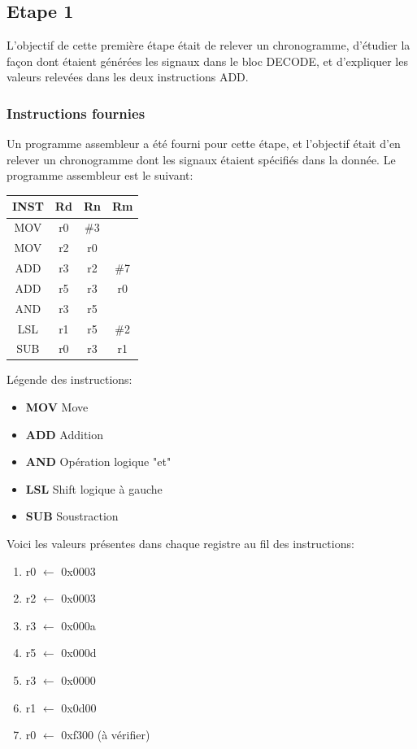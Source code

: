 \documentclass[a4paper]{article} %
\begin{document}
\subsection{Etape 1}
L'objectif de cette première étape était de relever un chronogramme, d'étudier la façon dont étaient générées les signaux dans le bloc DECODE, et d'expliquer les valeurs relevées dans les deux instructions ADD.
\subsubsection{Instructions fournies}
Un programme assembleur a été fourni pour cette étape, et l'objectif était d'en relever un chronogramme dont les signaux étaient spécifiés dans la donnée.
Le programme assembleur est le suivant:\medskip \\ 
\begin{center}
\begin{tabular}{|c|c|c|c|}
    \hline
    INST  & Rd & Rn   & Rm  \\
    \hline
    MOV  & r0 & \#3  &     \\
    \hline
    MOV  & r2 & r0   &     \\
    \hline
    ADD  & r3 & r2   & \#7 \\
    \hline
    ADD  & r5 & r3   & r0  \\
    \hline
    AND  & r3 & r5   &     \\
    \hline
    LSL  & r1 & r5   & \#2 \\
    \hline
    SUB  & r0 & r3   & r1  \\
    \hline
\end{tabular}
\end{center}

Légende des instructions:
\begin{itemize}
    \item \textbf{MOV} Move
    \item \textbf{ADD} Addition
    \item \textbf{AND} Opération logique "et"
    \item \textbf{LSL} Shift logique à gauche
    \item \textbf{SUB} Soustraction    
\end{itemize}
\medskip
Voici les valeurs présentes dans chaque registre au fil des instructions:
\begin{enumerate}
    \item r0 $\leftarrow$ 0x0003
    \item r2 $\leftarrow$ 0x0003
    \item r3 $\leftarrow$ 0x000a
    \item r5 $\leftarrow$ 0x000d
    \item r3 $\leftarrow$ 0x0000
    \item r1 $\leftarrow$ 0x0d00
    \item r0 $\leftarrow$ 0xf300 (à vérifier)
\end{enumerate}
\end{document}
